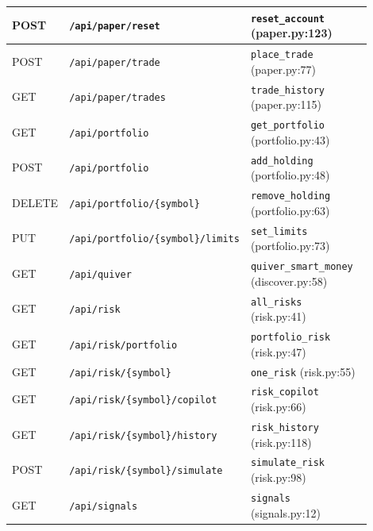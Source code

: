 {\begin{longtable}{|>{\centering\arraybackslash}p{0.11\linewidth}|p{0.42\linewidth}|p{0.37\linewidth}|}
POST & \texttt{/\allowbreak{}api/\allowbreak{}paper/\allowbreak{}reset} & \texttt{reset\_\allowbreak{}account} (paper.py:123)\\\hline
POST & \texttt{/\allowbreak{}api/\allowbreak{}paper/\allowbreak{}trade} & \texttt{place\_\allowbreak{}trade} (paper.py:77)\\\hline
GET & \texttt{/\allowbreak{}api/\allowbreak{}paper/\allowbreak{}trades} & \texttt{trade\_\allowbreak{}history} (paper.py:115)\\\hline
GET & \texttt{/\allowbreak{}api/\allowbreak{}portfolio} & \texttt{get\_\allowbreak{}portfolio} (portfolio.py:43)\\\hline
POST & \texttt{/\allowbreak{}api/\allowbreak{}portfolio} & \texttt{add\_\allowbreak{}holding} (portfolio.py:48)\\\hline
DELETE & \texttt{/\allowbreak{}api/\allowbreak{}portfolio/\allowbreak{}\{symbol\}} & \texttt{remove\_\allowbreak{}holding} (portfolio.py:63)\\\hline
PUT & \texttt{/\allowbreak{}api/\allowbreak{}portfolio/\allowbreak{}\{symbol\}/\allowbreak{}limits} & \texttt{set\_\allowbreak{}limits} (portfolio.py:73)\\\hline
GET & \texttt{/\allowbreak{}api/\allowbreak{}quiver} & \texttt{quiver\_\allowbreak{}smart\_\allowbreak{}money} (discover.py:58)\\\hline
GET & \texttt{/\allowbreak{}api/\allowbreak{}risk} & \texttt{all\_\allowbreak{}risks} (risk.py:41)\\\hline
GET & \texttt{/\allowbreak{}api/\allowbreak{}risk/\allowbreak{}portfolio} & \texttt{portfolio\_\allowbreak{}risk} (risk.py:47)\\\hline
GET & \texttt{/\allowbreak{}api/\allowbreak{}risk/\allowbreak{}\{symbol\}} & \texttt{one\_\allowbreak{}risk} (risk.py:55)\\\hline
GET & \texttt{/\allowbreak{}api/\allowbreak{}risk/\allowbreak{}\{symbol\}/\allowbreak{}copilot} & \texttt{risk\_\allowbreak{}copilot} (risk.py:66)\\\hline
GET & \texttt{/\allowbreak{}api/\allowbreak{}risk/\allowbreak{}\{symbol\}/\allowbreak{}history} & \texttt{risk\_\allowbreak{}history} (risk.py:118)\\\hline
POST & \texttt{/\allowbreak{}api/\allowbreak{}risk/\allowbreak{}\{symbol\}/\allowbreak{}simulate} & \texttt{simulate\_\allowbreak{}risk} (risk.py:98)\\\hline
GET & \texttt{/\allowbreak{}api/\allowbreak{}signals} & \texttt{signals} (signals.py:12)\\\hline

\end{longtable}}
